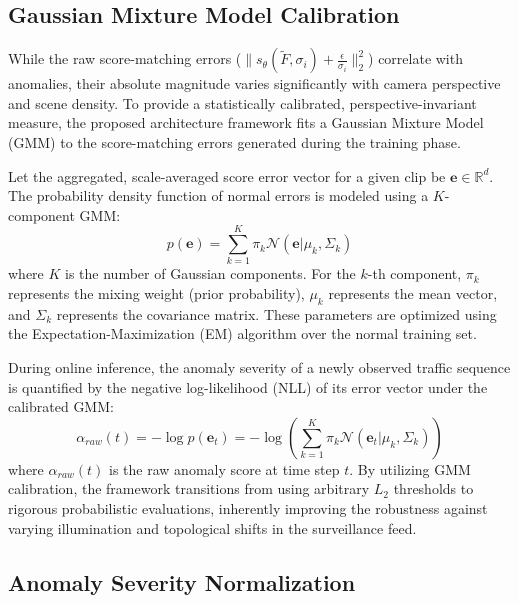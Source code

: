 \documentclass[conference]{IEEEtran}
\begin{document}
\subsection{Gaussian Mixture Model Calibration}
\label{subsec:gmm_calibration}

While the raw score-matching errors ($\| s_\theta(\tilde{F}, \sigma_i) + \frac{\epsilon}{\sigma_i} \|_2^2$) correlate with anomalies, their absolute magnitude varies significantly with camera perspective and scene density. To provide a statistically calibrated, perspective-invariant measure, the proposed architecture framework fits a Gaussian Mixture Model (GMM) to the score-matching errors generated during the training phase.

Let the aggregated, scale-averaged score error vector for a given clip be $\mathbf{e} \in \mathbb{R}^d$. The probability density function of normal errors is modeled using a $K$-component GMM:
\begin{equation}
p(\mathbf{e}) = \sum_{k=1}^{K} \pi_k \mathcal{N}(\mathbf{e} | \mu_k, \Sigma_k)
\label{eq:gmm_pdf}
\end{equation}
where $K$ is the number of Gaussian components. For the $k$-th component, $\pi_k$ represents the mixing weight (prior probability), $\mu_k$ represents the mean vector, and $\Sigma_k$ represents the covariance matrix. These parameters are optimized using the Expectation-Maximization (EM) algorithm over the normal training set.

During online inference, the anomaly severity of a newly observed traffic sequence is quantified by the negative log-likelihood (NLL) of its error vector under the calibrated GMM:
\begin{equation}
\alpha_{raw}(t) = - \log p(\mathbf{e}_t) = - \log \left( \sum_{k=1}^{K} \pi_k \mathcal{N}(\mathbf{e}_t | \mu_k, \Sigma_k) \right)
\label{eq:nll}
\end{equation}
where $\alpha_{raw}(t)$ is the raw anomaly score at time step $t$. By utilizing GMM calibration, the framework transitions from using arbitrary $L_2$ thresholds to rigorous probabilistic evaluations, inherently improving the robustness against varying illumination and topological shifts in the surveillance feed.

\subsection{Anomaly Severity Normalization}
\label{subsec:anomaly_normalization}
\end{document}
